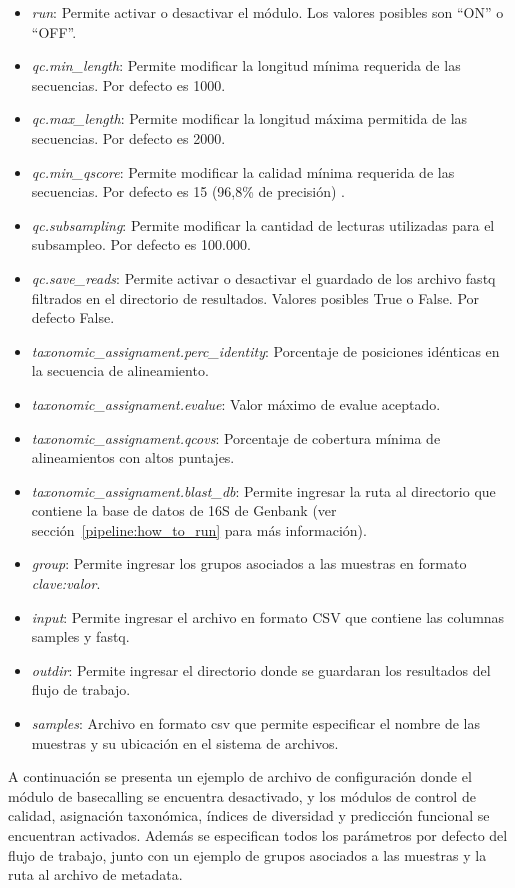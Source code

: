 \begin{itemize}
    \item \textit{run}: Permite activar o desactivar el módulo. Los valores posibles son ``ON'' o ``OFF''. 
    \item \textit{qc.min\_length}: Permite modificar la longitud mínima requerida de las secuencias. Por defecto es 1000.
    \item \textit{qc.max\_length}: Permite modificar la longitud máxima permitida de las secuencias. Por defecto es 2000.
    \item \textit{qc.min\_qscore}: Permite modificar la calidad mínima requerida de las secuencias. Por defecto es 15 (96,8\% de precisión) .
    \item \textit{qc.subsampling}: Permite modificar la cantidad de lecturas utilizadas para el subsampleo. Por defecto es 100.000.
    \item \textit{qc.save\_reads}: Permite activar o desactivar el guardado de los archivo fastq filtrados en el directorio de resultados. Valores posibles True o False. Por defecto False. 
    \item \textit{taxonomic\_assignament.perc\_identity}: Porcentaje de posiciones idénticas en la secuencia de alineamiento.
    \item \textit{taxonomic\_assignament.evalue}: Valor máximo de evalue aceptado.
    \item \textit{taxonomic\_assignament.qcovs}: Porcentaje de cobertura mínima de alineamientos con altos puntajes.
    \item \textit{taxonomic\_assignament.blast\_db}: Permite ingresar la ruta al directorio que contiene la base de datos de 16S de Genbank (ver sección~\ref{pipeline:how_to_run} para más información).
    \item \textit{group}: Permite ingresar los grupos asociados a las muestras en formato \textit{clave:valor}.
    \item \textit{input}: Permite ingresar el archivo en formato CSV que contiene las columnas samples y fastq.
    \item \textit{outdir}: Permite ingresar el directorio donde se guardaran los resultados del flujo de trabajo.
    \item \textit{samples}: Archivo en formato csv que permite especificar  el nombre de las muestras y su ubicación en el sistema de archivos.
\end{itemize}

A continuación se presenta un ejemplo de archivo de configuración donde el módulo de basecalling se encuentra desactivado, y los módulos de control de calidad, asignación taxonómica, índices de diversidad y predicción funcional se encuentran activados.
Además se especifican todos los parámetros por defecto del flujo de trabajo, junto con un ejemplo de grupos asociados a las muestras y la ruta al archivo de metadata.



